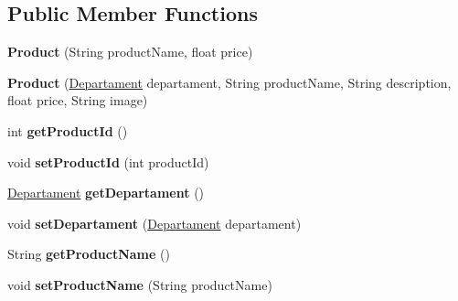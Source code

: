 \subsection*{Public Member Functions}
\begin{DoxyCompactItemize}
\item 
\mbox{\label{classentity_1_1_product_a16490d212d113e14eb833a18ffd35c9e}} 
{\bfseries Product} (String product\+Name, float price)
\item 
\mbox{\label{classentity_1_1_product_aac8d06cb1b251960fd960abec0ed08ce}} 
{\bfseries Product} (\mbox{\hyperlink{classentity_1_1_departament}{Departament}} departament, String product\+Name, String description, float price, String image)
\item 
\mbox{\label{classentity_1_1_product_a2d097a6e21ca5384407ef2d5629409d0}} 
int {\bfseries get\+Product\+Id} ()
\item 
\mbox{\label{classentity_1_1_product_ad9a9458cf69f508b1d80cd90f4649343}} 
void {\bfseries set\+Product\+Id} (int product\+Id)
\item 
\mbox{\label{classentity_1_1_product_a78bd5ae5f85a3d22bdd23b84c07f1ed4}} 
\mbox{\hyperlink{classentity_1_1_departament}{Departament}} {\bfseries get\+Departament} ()
\item 
\mbox{\label{classentity_1_1_product_aa67771d630e8eb1922b751a266df6a62}} 
void {\bfseries set\+Departament} (\mbox{\hyperlink{classentity_1_1_departament}{Departament}} departament)
\item 
\mbox{\label{classentity_1_1_product_a81d43916d1f7b73a2f087e3570d73de0}} 
String {\bfseries get\+Product\+Name} ()
\item 
\mbox{\label{classentity_1_1_product_abbed2e3b34beb9eff42595b8e2641f7a}} 
void {\bfseries set\+Product\+Name} (String product\+Name)
\item 
\mbox{\label{classentity_1_1_product_a33ba8df9ce2e2cbf6091bb97a0ee0f2c}} 

\end{DoxyCompactItemize}
